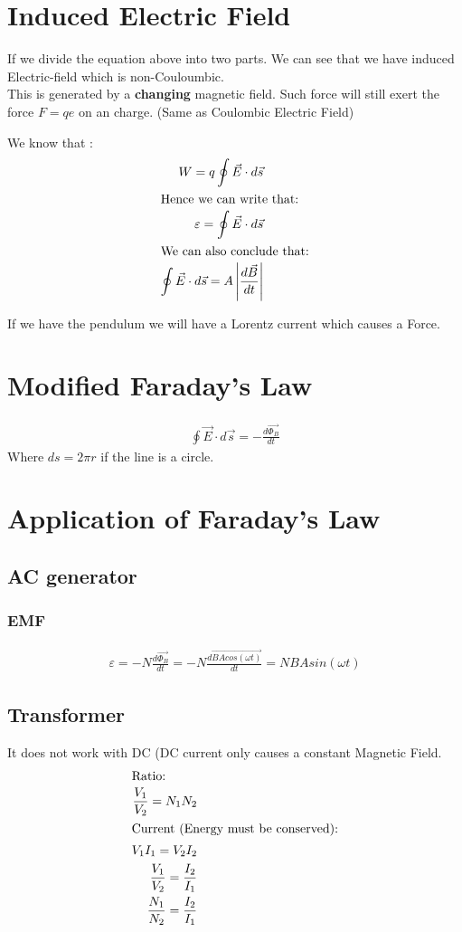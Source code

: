 \documentclass[12pt]{article}
\numberwithin{equation}{section}
\begin{document}
\section{Induced Electric Field}
If we divide the equation above into two parts. We can see that we have induced Electric-field which is non-Couloumbic. \\
This is generated by a \textbf{changing} magnetic field. Such force will still exert the force $F=qe$ on an charge. (Same as Coulombic Electric Field)

We know that :
\begin{align}
W=q \oint\vec{E}\cdot d \vec{s} \\
\intertext{Hence we can write that:}
\varepsilon= \oint \vec{E}\cdot d \vec{s} \\
\intertext{We can also conclude that:}
\oint \vec{E}\cdot d \vec{s} = A \left|\frac{d\vec{B}}{dt} \right| \\
\end{align}

If we have the pendulum we will have a Lorentz current which causes a Force.

\section{Modified Faraday's Law}
\begin{align}
\oint \vec{E}\cdot d \vec{s} =  - \frac{d\vec{\Phi_B}}{dt}
\end{align}
Where $ds = 2 \pi r$ if the line is a circle.

\section{Application of Faraday's Law}
\subsection{AC generator}
\subsubsection{EMF}
\begin{align}
\varepsilon =  - N \frac{d\vec{\Phi_B}}{dt} =  - N \frac{d\vec{BA cos (\omega t)}}{dt} = NBA sin (\omega t)
\end{align}
\pagebreak
\subsection{Transformer}
It does not work with DC (DC current only causes a constant Magnetic Field.
\begin{align}
\intertext{Ratio:}
\frac{V_1}{V_2}={N_1}{N_2} \\
\intertext{Current (Energy must be conserved):}
V_1I_1=V_2I_2\\
\frac{V_1}{V_2}=\frac{I_2}{I_1}\\
\frac{N_1}{N_2}=\frac{I_2}{I_1}
\end{align}
\end{document}
